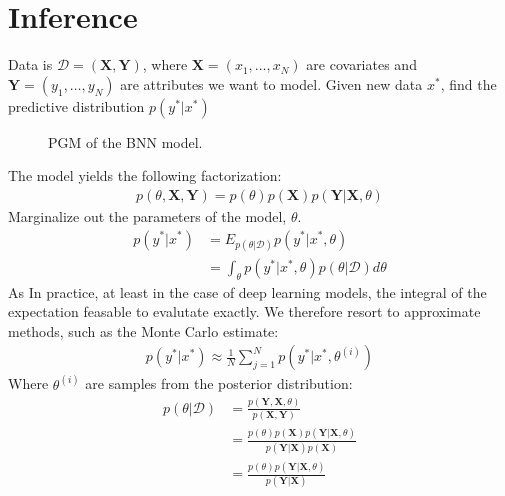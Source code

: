 \chapter{Inference}

Data is $\mathcal{D} = (\bm{X}, \bm{Y})$, where $\bm{X} = (x_1,\dots,x_N)$ are covariates and $\bm{Y} = (y_1, \dots, y_N)$ are attributes we want to model.
Given new data $x^\ast$, find the predictive distribution $p(y^\ast | x^\ast)$ 

\begin{figure}[htbp]
    \centering
    \caption{PGM of the BNN model.}
\end{figure}

The model yields the following factorization:
\begin{align*}
    p(\theta, \bm X, \bm Y) = p(\theta) p(\bm X) p(\bm Y | \bm X, \theta)
\end{align*}
Marginalize out the parameters of the model, $\theta$.
\begin{align*}
    p(y^\ast | x^\ast) &= E_{p(\theta|\mathcal{D})} p(y^\ast | x^\ast, \theta) \\
                       &= \int_{\theta} p(y^\ast | x^\ast, \theta)  p(\theta|\mathcal{D}) d\theta
\end{align*}
As
In practice, at least in the case of deep learning models, the integral of the expectation feasable to evalutate exactly. 
We therefore resort to approximate methods, such as the Monte Carlo estimate:
\begin{align*}
    p(y^\ast | x^\ast)  \approx \frac{1}{N} \sum_{j=1}^N p(y^\ast | x^\ast, \theta^{(i)}) 
\end{align*}
Where $\theta^{(i)}$ are samples from the posterior distribution:
\begin{align*}
    p(\theta | \mathcal{D}) 
    &= \frac{p(\bm Y , \bm X, \theta)}{p(\bm{X}, \bm{Y})}\\
    &= \frac{p(\theta) p(\bm X) p(\bm Y | \bm X, \theta)}{p(\bm{Y}|\bm{X})p(\bm{X})} \\
    &= \frac{p(\theta) p(\bm Y | \bm X, \theta)}{p(\bm{Y}|\bm{X})}
\end{align*}

